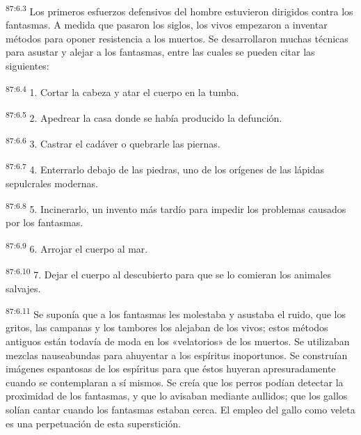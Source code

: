 \par
\textsuperscript{87:6.3} Los primeros esfuerzos defensivos del hombre estuvieron dirigidos contra los fantasmas. A medida que pasaron los siglos, los vivos empezaron a inventar métodos para oponer resistencia a los muertos. Se desarrollaron muchas técnicas para asustar y alejar a los fantasmas, entre las cuales se pueden citar las siguientes:

\par
\textsuperscript{87:6.4} 1. Cortar la cabeza y atar el cuerpo en la tumba.

\par
\textsuperscript{87:6.5} 2. Apedrear la casa donde se había producido la defunción.

\par
\textsuperscript{87:6.6} 3. Castrar el cadáver o quebrarle las piernas.

\par
\textsuperscript{87:6.7} 4. Enterrarlo debajo de las piedras, uno de los orígenes de las lápidas sepulcrales modernas.

\par
\textsuperscript{87:6.8} 5. Incinerarlo, un invento más tardío para impedir los problemas causados por los fantasmas.

\par
\textsuperscript{87:6.9} 6. Arrojar el cuerpo al mar.

\par
\textsuperscript{87:6.10} 7. Dejar el cuerpo al descubierto para que se lo comieran los animales salvajes.

\par
\textsuperscript{87:6.11} Se suponía que a los fantasmas les molestaba y asustaba el ruido, que los gritos, las campanas y los tambores los alejaban de los vivos; estos métodos antiguos están todavía de moda en los «velatorios» de los muertos. Se utilizaban mezclas nauseabundas para ahuyentar a los espíritus inoportunos. Se construían imágenes espantosas de los espíritus para que éstos huyeran apresuradamente cuando se contemplaran a sí mismos. Se creía que los perros podían detectar la proximidad de los fantasmas, y que lo avisaban mediante aullidos; que los gallos solían cantar cuando los fantasmas estaban cerca. El empleo del gallo como veleta es una perpetuación de esta superstición.

